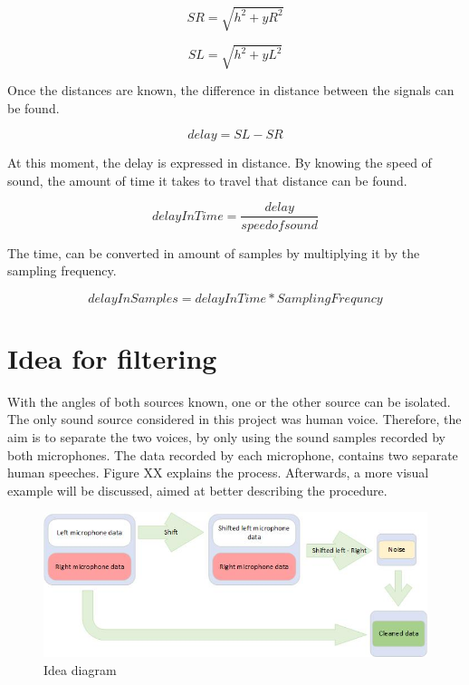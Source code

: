 \begin{equation}
	SR = \sqrt{h^2 + yR^2}
\end{equation}

\begin{equation}
	SL = \sqrt{h^2 + yL^2}
\end{equation}

Once the distances are known, the difference in distance between the signals can be found.

\begin{equation}
	delay = SL - SR
\end{equation}

At this moment, the delay is expressed in distance. By knowing the speed of sound, the amount of
time it takes to travel that distance can be found.

\begin{equation}
	delayInTime = \frac{delay}{speed of sound}
\end{equation}

The time, can be converted in amount of samples by multiplying it by the sampling frequency.

\begin{equation}
	delayInSamples = delayInTime * SamplingFrequncy
\end{equation}

\newpage
\section{Idea for filtering}
With the angles of both sources known, one or the other source can be isolated. The only 
sound source considered in this project was human voice. Therefore, the aim is to 
separate the two voices, by only using the sound samples recorded by both microphones. 
The data recorded by each microphone, contains two separate human speeches.
Figure XX explains the process. Afterwards, a more visual example will be discussed,
aimed at better describing the procedure. 

\begin{figure}[htp]
	\centering
	\includegraphics[width=1\textwidth]{Illustrations/IdeaDiagram.jpg}
	\caption{Idea diagram}
	\label{fig:IdeaDiagram}
\end{figure}

